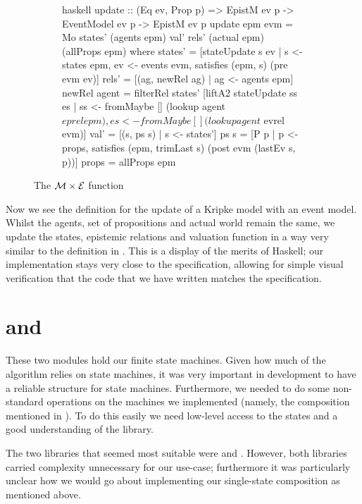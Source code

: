 \documentclass[10pt, a4paper]{report}
\begin{document}
\begin{figure}[h]
  \begin{subfigure}[b]{0.5\textwidth}
  \begin{cminted}{haskell}
    update :: (Eq ev, Prop p) => EpistM ev p -> EventModel ev p -> EpistM ev p
    update epm evm = Mo states' (agents epm) val' rels' (actual epm) (allProps epm)
      where
        states' = [stateUpdate s ev | s <- states epm,
                                      ev <- events evm,
                                      satisfies (epm, s) (pre evm ev)]
        rels' = [(ag, newRel ag) | ag <- agents epm]
        newRel agent = filterRel states' [liftA2 stateUpdate ss es |
                                          ss <- fromMaybe [] (lookup agent $ eprel epm),
                                          es <- fromMaybe [] (lookup agent $ evrel evm)]
        val' = [(s, ps s) | s <- states']
        ps s = [P p | p <- props, satisfies (epm, trimLast s) (post evm (lastEv s, p))]
        props = allProps epm
  \end{cminted}
\end{subfigure}
\caption{The $\mathcal{M} \times \mathcal{E}$ function}
\label{fig:update}
\end{figure}

Now we see the definition for the update of a Kripke model with an event model.
Whilst the agents, set of propositions and actual world remain the same, we
update the states, epistemic relations and valuation function in a way very
similar to the definition in . This is a display of
the merits of Haskell; our implementation stays very close to the specification,
allowing for simple visual verification that the code that we have written matches
the specification. 

\section{ and }

These two modules hold our finite state machines. Given how much of the
algorithm relies on state machines, it was very important in development to have
a reliable structure for state machines. Furthermore, we needed to do some
non-standard operations on the machines we implemented (namely, the composition
mentioned in ). To do this easily we need
low-level access to the states and a good understanding of the library. 

The two libraries that seemed most suitable were \cite{HaskellFST} and
\cite{HaskellMachines}. However, both libraries carried complexity unnecessary
for our use-case; furthermore it was particularly unclear how we would go
about implementing our single-state composition as mentioned above. 
\end{document}
